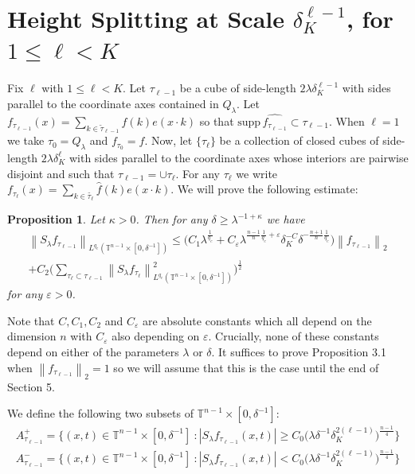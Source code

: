 \documentclass[11pt]{amsart}
\numberwithin{equation}{section}
\newcommand{\Tn}{\mathbb{T}^{n-1}}
\newcommand{\la}{\lambda}
\newcommand\norm[1]{\left\lVert#1\right\rVert}
\newcommand{\lpnorm}[3]{\norm{#1}_{L^{#2}(#3)}}
\newcommand{\altlpnorm}[2]{\norm{#1}_{#2}}
\newcommand{\fsupp}[1]{\text{supp}\, \widehat{#1}}
\newcommand{\Sl}{S_{\la}}
\newcommand{\dK}[1]{\delta_{K}^{#1}}
\newtheorem{proposition}{Proposition}[section]
\begin{document}
\section{Height Splitting at Scale $\dK{\ell - 1}$, for $1 \leq \ell < K$}

Fix $\ell$ with $1 \leq \ell < K$. Let $\tau_{\ell - 1}$ be a cube of side-length $2\la \dK{\ell - 1}$ with sides parallel to the coordinate axes contained in $Q_{\la}$. Let $f_{\tau_{\ell -1}}(x) = \sum_{k \in \tilde{\tau}_{\ell - 1}}\widehat{f}(k)e(x \cdot k)$ so that $\fsupp{f_{\tau_{\ell-1}}} \subset \tau_{\ell - 1}$. When $\ell = 1$ we take $\tau_{0} = Q_{\la}$ and $f_{\tau_{0}} = f$. Now, let $\{\tau_{\ell}\}$ be a collection of closed cubes of side-length $2\la \dK{\ell}$ with sides parallel to the coordinate axes whose interiors are pairwise disjoint and such that $\tau_{\ell - 1} = \cup \tau_{\ell}$. For any $\tau_{\ell}$ we write $f_{\tau_{\ell}}(x) = \sum_{k \in \tilde{\tau_{\ell}}}\widehat{f}(k)e(x \cdot k)$.
We will prove the following estimate:
\begin{proposition}
Let $\kappa > 0$. Then for any $\delta \geq \la^{-1 + \kappa}$ we have
\begin{equation}
\begin{split}
    \lpnorm{\Sl f_{\tau_{\ell-1}}}{q_c}{\Tn\times[0, \delta^{-1}]} \leq \big(C_1 \la^{\frac{1}{q_c}} + C_{\varepsilon}\la^{\frac{n-1}{n}\frac{1}{q_c} + \varepsilon}\dK{-C}\delta^{-\frac{n+1}{n}\frac{1}{q_c}}\big)\altlpnorm{f_{\tau_{\ell-1}}}{2} \\
    + C_2\Big(\sum_{\tau_{\ell} \subset \tau_{\ell - 1}}\lpnorm{\Sl f_{\tau_{\ell}}}{q_c}{\Tn \times [0, \delta^{-1}]}^{2}\Big)^{\frac{1}{2}}
\end{split}
\end{equation}
for any $\varepsilon > 0$.
\end{proposition}
\noindent Note that $C, C_1, C_2$ and $C_{\varepsilon}$ are absolute constants which all depend on the dimension $n$ with $C_{\varepsilon}$ also depending on $\varepsilon$. Crucially, none of these constants depend on either of the parameters $\la$ or $\delta$. It suffices to prove Proposition 3.1 when $\altlpnorm{f_{\tau_{\ell - 1}}}{2} = 1$ so we will assume that this is the case until the end of Section 5.


We define the following two subsets of $\Tn \times [0,\delta^{-1}]$:
\begin{equation} \label{height decomposition definitions}
\begin{split}
    A^{+}_{\tau_{\ell - 1}} = \{(x,t) \in \Tn \times [0,\delta^{-1}] \ : |\Sl f_{\tau_{\ell - 1}}(x,t)| \geq C_0\big(\la \delta^{-1}\dK{2(\ell - 1)}\big)^{\frac{n-1}{4}} \} \\
    A^{-}_{\tau_{\ell - 1}} = \{(x,t) \in \Tn \times [0,\delta^{-1}] \ : |\Sl f_{\tau_{\ell - 1}}(x,t)| < C_0\big(\la \delta^{-1}\dK{2(\ell - 1)}\big)^{\frac{n-1}{4}} \}
\end{split}
\end{equation}
\end{document}
